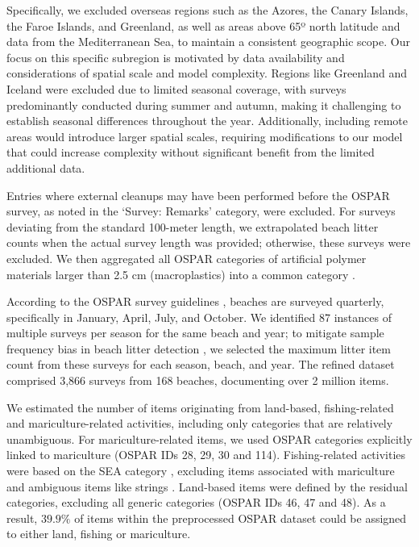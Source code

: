 Specifically, we excluded overseas regions such as the Azores, the Canary Islands, the Faroe Islands, and Greenland, as well as areas above 65º north latitude and data from the Mediterranean Sea, to maintain a consistent geographic scope. Our focus on this specific subregion is motivated by data availability and considerations of spatial scale and model complexity. Regions like Greenland and Iceland were excluded due to limited seasonal coverage, with surveys predominantly conducted during summer and autumn, making it challenging to establish seasonal differences throughout the year. Additionally, including remote areas would introduce larger spatial scales, requiring modifications to our model that could increase complexity without significant benefit from the limited additional data.

Entries where external cleanups may have been performed before the OSPAR survey, as noted in the `Survey: Remarks' category, were excluded. For surveys deviating from the standard 100-meter length, we extrapolated beach litter counts when the actual survey length was provided; otherwise, these surveys were excluded. We then aggregated all OSPAR categories of artificial polymer materials larger than 2.5 cm (macroplastics) into a common category \cite{lacroix_abundance_2023}. 

According to the OSPAR survey guidelines \cite{wenneker_guideline_2010}, beaches are surveyed quarterly, specifically in January, April, July, and October. We identified 87 instances of multiple surveys per season for the same beach and year; to mitigate sample frequency bias in beach litter detection \cite{ryan_effect_2014}, we selected the maximum litter item count from these surveys for each season, beach, and year. The refined dataset comprised 3,866 surveys from 168 beaches, documenting over 2 million items.

We estimated the number of items originating from land-based, fishing-related and mariculture-related activities, including only categories that are relatively unambiguous. For mariculture-related items, we used OSPAR categories explicitly linked to mariculture \cite{skirtun_plastic_2022} (OSPAR IDs 28, 29, 30 and 114). Fishing-related activities were based on the SEA category \cite{lacroix_abundance_2023}, excluding items associated with mariculture and ambiguous items like strings \cite{skirtun_plastic_2022}. Land-based items were defined by the residual categories, excluding all generic categories (OSPAR IDs 46, 47 and 48). As a result, $39.9\%$ of items within the preprocessed OSPAR dataset could be assigned to either land, fishing or mariculture.



